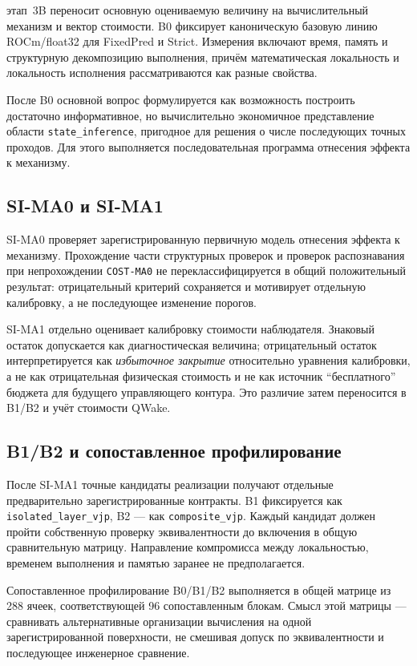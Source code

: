 этап~3B переносит основную оцениваемую величину на вычислительный механизм и
вектор стоимости. B0 фиксирует каноническую базовую линию ROCm/float32 для
FixedPred и Strict. Измерения включают время, память и структурную декомпозицию
выполнения, причём математическая локальность и локальность исполнения
рассматриваются как разные свойства.

После B0 основной вопрос формулируется как возможность построить достаточно
информативное, но вычислительно экономичное представление области
\texttt{state\_inference}, пригодное для решения о числе последующих точных
проходов. Для этого выполняется последовательная программа отнесения эффекта к
механизму.

\subsection{SI-MA0 и SI-MA1}

SI-MA0 проверяет зарегистрированную первичную модель отнесения эффекта к
механизму. Прохождение части структурных проверок и проверок распознавания при
непрохождении \texttt{COST-MA0} не переклассифицируется в общий положительный
результат: отрицательный критерий сохраняется и мотивирует отдельную
калибровку, а не последующее изменение порогов.

SI-MA1 отдельно оценивает калибровку стоимости наблюдателя. Знаковый остаток
допускается как диагностическая величина; отрицательный остаток интерпретируется
как \emph{избыточное закрытие} относительно уравнения калибровки, а не как
отрицательная физическая стоимость и не как источник ``бесплатного'' бюджета
для будущего управляющего контура. Это различие затем переносится в B1/B2 и
учёт стоимости QWake.

\subsection{B1/B2 и сопоставленное профилирование}

После SI-MA1 точные кандидаты реализации получают отдельные предварительно
зарегистрированные контракты. B1 фиксируется как
\texttt{isolated\_layer\_vjp}, B2 --- как \texttt{composite\_vjp}. Каждый
кандидат должен пройти собственную проверку эквивалентности до включения в
общую сравнительную матрицу. Направление компромисса между локальностью,
временем выполнения и памятью заранее не предполагается.

Сопоставленное профилирование B0/B1/B2 выполняется в общей матрице из 288
ячеек, соответствующей 96 сопоставленным блокам. Смысл этой матрицы ---
сравнивать альтернативные организации вычисления на одной зарегистрированной
поверхности, не смешивая допуск по эквивалентности и последующее инженерное
сравнение.

